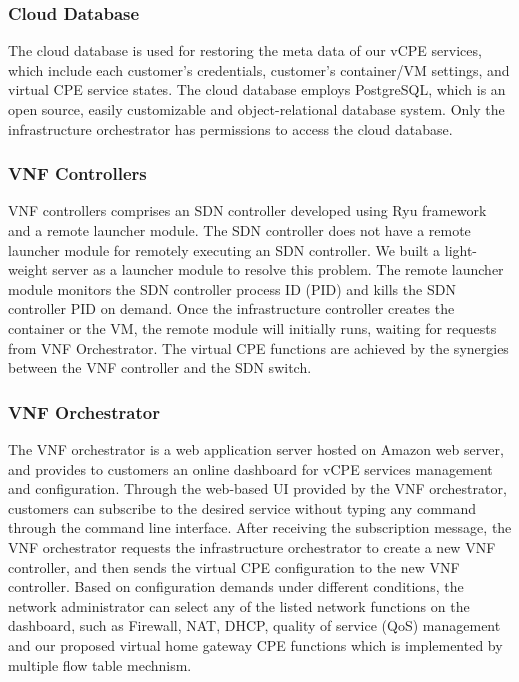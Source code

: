 \subsubsection{Cloud Database}
The cloud database is used for restoring the meta data of our vCPE services, which include each customer’s credentials, customer’s container/VM settings, and virtual CPE service states. The cloud database employs PostgreSQL, which is an open source, easily customizable and object-relational database system. Only the infrastructure orchestrator has permissions to access the cloud database.

\subsubsection{VNF Controllers}
VNF controllers comprises an SDN controller developed using Ryu framework \cite{ryu} and a remote launcher module. The SDN controller does not have a remote launcher module for remotely executing an SDN controller. We built a light-weight server as a launcher module to resolve this problem. The remote launcher module monitors the SDN controller process ID (PID) and kills the SDN controller PID on demand. Once the infrastructure controller  creates the container or the VM, the remote module will initially runs, waiting for requests from VNF Orchestrator. The virtual CPE functions are achieved by the synergies between the VNF controller and the SDN switch.

\subsubsection{VNF Orchestrator}
The VNF orchestrator is a web application server hosted on Amazon web server, and provides to customers an online dashboard for vCPE services management and configuration. Through the web-based UI provided by the VNF orchestrator, customers can subscribe to the desired service without typing any command through the command line interface. After receiving the subscription message, the VNF orchestrator requests the infrastructure orchestrator to create a new VNF controller, and then sends the virtual CPE configuration to the new VNF controller. Based on configuration demands under different conditions, the network administrator can select any of the listed network functions on the dashboard, such as Firewall, NAT, DHCP, quality of service (QoS) management and our proposed virtual home gateway CPE functions which is implemented by multiple flow table mechnism.
